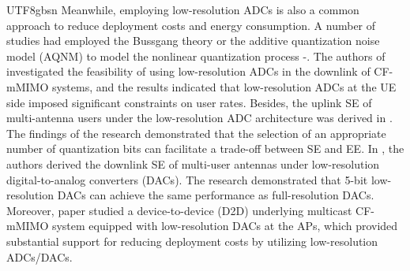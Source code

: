 \documentclass[lettersize,journal]{IEEEtran}
\begin{document}
\begin{CJK}{UTF8}{gbsn}
Meanwhile, employing low-resolution ADCs is also a common approach to reduce deployment costs and energy consumption. A number of studies had employed the Bussgang theory or the additive quantization noise model (AQNM) to model the nonlinear quantization process \cite{paperIA9}-\cite{paperIA12}. The authors of \cite{paperIA9} investigated the feasibility of using low-resolution ADCs in the downlink of CF-mMIMO systems, and the results indicated that low-resolution ADCs at the UE side imposed significant constraints on user rates. Besides, the uplink SE of multi-antenna users under the low-resolution ADC architecture was derived in \cite{paperIA10}. The findings of the research demonstrated that the selection of an appropriate number of quantization bits can facilitate a trade-off between SE and EE. In \cite{paperIA11}, the authors derived the downlink SE of multi-user antennas under low-resolution digital-to-analog converters (DACs). The research demonstrated that 5-bit low-resolution DACs can achieve the same performance as full-resolution DACs. Moreover, paper \cite{paperIA12} studied a device-to-device (D2D) underlying multicast CF-mMIMO system equipped with low-resolution DACs at the APs, which provided substantial support for reducing deployment costs by utilizing low-resolution ADCs/DACs.


\end{CJK}
\end{document}
